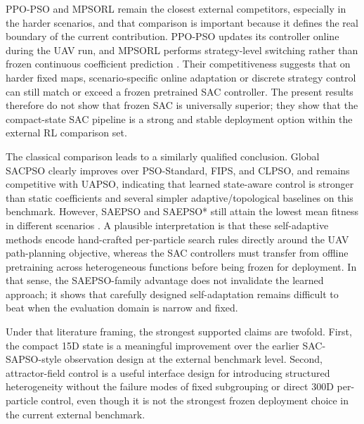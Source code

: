 \documentclass[final,5p,times]{elsarticle}
\begin{document}
PPO-PSO and MPSORL remain the closest external competitors, especially in the harder scenarios, and that comparison is important because it defines the real boundary of the current contribution. PPO-PSO updates its controller online during the UAV run, and MPSORL performs strategy-level switching rather than frozen continuous coefficient prediction \cite{Klein2024Optimizing, Meng2023Multistrategy}. Their competitiveness suggests that on harder fixed maps, scenario-specific online adaptation or discrete strategy control can still match or exceed a frozen pretrained SAC controller. The present results therefore do not show that frozen SAC is universally superior; they show that the compact-state SAC pipeline is a strong and stable deployment option within the external RL comparison set.

The classical comparison leads to a similarly qualified conclusion. Global SACPSO clearly improves over PSO-Standard, FIPS, and CLPSO, and remains competitive with UAPSO, indicating that learned state-aware control is stronger than static coefficients and several simpler adaptive/topological baselines on this benchmark. However, SAEPSO and SAEPSO* still attain the lowest mean fitness in different scenarios \cite{Liu2025A}. A plausible interpretation is that these self-adaptive methods encode hand-crafted per-particle search rules directly around the UAV path-planning objective, whereas the SAC controllers must transfer from offline pretraining across heterogeneous functions before being frozen for deployment. In that sense, the SAEPSO-family advantage does not invalidate the learned approach; it shows that carefully designed self-adaptation remains difficult to beat when the evaluation domain is narrow and fixed.

Under that literature framing, the strongest supported claims are twofold. First, the compact 15D state is a meaningful improvement over the earlier SAC-SAPSO-style observation design at the external benchmark level. Second, attractor-field control is a useful interface design for introducing structured heterogeneity without the failure modes of fixed subgrouping or direct 300D per-particle control, even though it is not the strongest frozen deployment choice in the current external benchmark.
\end{document}
